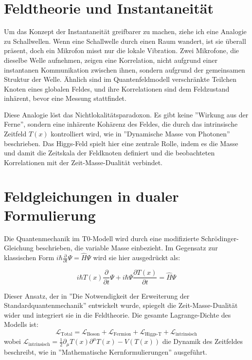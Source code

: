 \documentclass[a4paper,12pt]{article}
\newcommand{\Tfield}{T(x)}
\theoremstyle{definition}
\theoremstyle{remark}
\begin{document}
	\section{Feldtheorie und Instantaneität}
	
	Um das Konzept der Instantaneität greifbarer zu machen, ziehe ich eine Analogie zu Schallwellen. Wenn eine Schallwelle durch einen Raum wandert, ist sie überall präsent, doch ein Mikrofon misst nur die lokale Vibration. Zwei Mikrofone, die dieselbe Welle aufnehmen, zeigen eine Korrelation, nicht aufgrund einer instantanen Kommunikation zwischen ihnen, sondern aufgrund der gemeinsamen Struktur der Welle. Ähnlich sind im Quantenfeldmodell verschränkte Teilchen Knoten eines globalen Feldes, und ihre Korrelationen sind dem Feldzustand inhärent, bevor eine Messung stattfindet.
	
	Diese Analogie löst das Nichtlokalitätsparadoxon. Es gibt keine ''Wirkung aus der Ferne'', sondern eine inhärente Kohärenz des Feldes, die durch das intrinsische Zeitfeld \(\Tfield\) kontrolliert wird, wie in ''Dynamische Masse von Photonen'' \cite{pascher_photons_2025} beschrieben. Das Higgs-Feld spielt hier eine zentrale Rolle, indem es die Masse und damit die Zeitskala der Feldknoten definiert und die beobachteten Korrelationen mit der Zeit-Masse-Dualität verbindet.
	
	\section{Feldgleichungen in dualer Formulierung}
	
	Die Quantenmechanik im T0-Modell wird durch eine modifizierte Schrödinger-Gleichung beschrieben, die variable Masse einbezieht. Im Gegensatz zur klassischen Form \(i\hbar \frac{\partial}{\partial t} \Psi = \hat{H} \Psi\) wird sie hier ausgedrückt als:
	
	\begin{equation}
		i\hbar \Tfield \frac{\partial}{\partial t} \Psi + i\hbar \Psi \frac{\partial \Tfield}{\partial t} = \hat{H} \Psi
	\end{equation}
	
	Dieser Ansatz, der in ''Die Notwendigkeit der Erweiterung der Standardquantenmechanik'' \cite{pascher_quantum_2025} entwickelt wurde, spiegelt die Zeit-Masse-Dualität wider und integriert sie in die Feldtheorie. Die gesamte Lagrange-Dichte des Modells ist:
	\begin{equation}
		\mathcal{L}_{\text{Total}} = \mathcal{L}_{\text{Boson}} + \mathcal{L}_{\text{Fermion}} + \mathcal{L}_{\text{Higgs-T}} + \mathcal{L}_{\text{intrinsisch}}
	\end{equation}
	wobei \(\mathcal{L}_{\text{intrinsisch}} = \frac{1}{2} \partial_\mu \Tfield \partial^\mu \Tfield - V(\Tfield)\) die Dynamik des Zeitfeldes beschreibt, wie in ''Mathematische Kernformulierungen'' \cite{pascher_lagrange_2025} ausgeführt.
	
\end{document}
